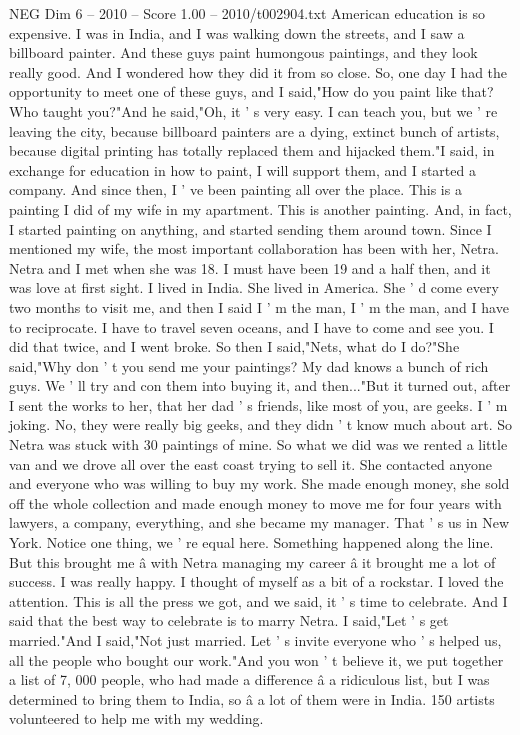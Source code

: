 \begin{textsample}{NEG Dim 6 – 2010 – Score 1.00 – 2010/t002904.txt}
American education is so expensive.
I was in India, and I was walking down the streets, and I saw a billboard painter.
And these guys paint humongous paintings, and they look really good.
And I wondered how they did it from so close.
So, one day I had the opportunity to meet one of these guys, and I said,"How do you paint like that?
Who taught you?"And he said,"Oh, it ' s very easy.
I can teach you, but we ' re leaving the city, because billboard painters are a dying, extinct bunch of artists, because digital printing has totally replaced them and hijacked them."I said, in exchange for education in how to paint, I will support them, and I started a company.
And since then, I ' ve been painting all over the place.
This is a painting I did of my wife in my apartment.
This is another painting.
And, in fact, I started painting on anything, and started sending them around town.
Since I mentioned my wife, the most important collaboration has been with her, Netra.
Netra and I met when she was 18.
I must have been 19 and a half then, and it was love at first sight.
I lived in India.
She lived in America.
She ' d come every two months to visit me, and then I said I ' m the man, I ' m the man, and I have to reciprocate.
I have to travel seven oceans, and I have to come and see you.
I did that twice, and I went broke.
So then I said,"Nets, what do I do?"She said,"Why don ' t you send me your paintings?
My dad knows a bunch of rich guys.
We ' ll try and con them into buying it, and then..."But it turned out, after I sent the works to her, that her dad ' s friends, like most of you, are geeks.
I ' m joking.
No, they were really big geeks, and they didn ' t know much about art.
So Netra was stuck with 30 paintings of mine.
So what we did was we rented a little van and we drove all over the east coast trying to sell it.
She contacted anyone and everyone who was willing to buy my work.
She made enough money, she sold off the whole collection and made enough money to move me for four years with lawyers, a company, everything, and she became my manager.
That ' s us in New York.
Notice one thing, we ' re equal here.
Something happened along the line.
But this brought me â with Netra managing my career â it brought me a lot of success.
I was really happy.
I thought of myself as a bit of a rockstar.
I loved the attention.
This is all the press we got, and we said, it ' s time to celebrate.
And I said that the best way to celebrate is to marry Netra.
I said,"Let ' s get married."And I said,"Not just married.
Let ' s invite everyone who ' s helped us, all the people who bought our work."And you won ' t believe it, we put together a list of 7, 000 people, who had made a difference â a ridiculous list, but I was determined to bring them to India, so â a lot of them were in India. 150 artists volunteered to help me with my wedding.

\end{textsample}
